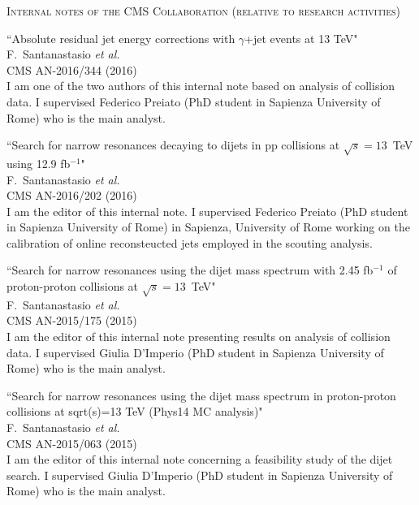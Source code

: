 \documentclass[10pt, a4paper]{article}
\begin{document}
\begin{thebibliography}{599}
\vspace{0.1cm} \begin{center} \textsc{Internal notes of the CMS Collaboration (relative to research activities)} \end{center} \vspace{0.05cm}

``Absolute residual jet energy corrections with $\gamma$+jet events at 13 TeV"
  \\{}F.~Santanastasio {\it et al.}
  \\{}CMS AN-2016/344 (2016)
  \\ I am one of the two authors of this internal note based on
  analysis of collision data. I supervised
  Federico Preiato (PhD student in Sapienza University of Rome) who is
  the main analyst.

``Search for narrow resonances decaying to dijets in pp collisions at $\sqrt{s}=13$~TeV using 12.9 fb$^{-1}$"
  \\{}F.~Santanastasio {\it et al.}
  \\{}CMS AN-2016/202 (2016)
  \\ I am the editor of this internal note. I supervised Federico Preiato (PhD student in Sapienza University of Rome)
  in Sapienza, University of Rome working on the calibration of online
  reconsteucted jets employed in the scouting analysis.

``Search for narrow resonances using the dijet mass spectrum with 2.45 fb$^{-1}$ of proton-proton collisions at $\sqrt{s}=13$~TeV"
  \\{}F.~Santanastasio {\it et al.}
  \\{}CMS AN-2015/175 (2015)
  \\ I am the editor of this internal note presenting results on
  analysis of collision data. I supervised Giulia D'Imperio (PhD
  student in Sapienza University of Rome) who is the main analyst.

``Search for narrow resonances using the dijet mass spectrum in proton-proton collisions at sqrt(s)=13 TeV (Phys14 MC analysis)"
  \\{}F.~Santanastasio {\it et al.}
  \\{}CMS AN-2015/063 (2015)
  \\ I am the editor of this internal note concerning a feasibility study of
  the dijet search. I supervised Giulia D'Imperio (PhD student in Sapienza University of Rome) who is
  the main analyst.


\end{thebibliography}
\end{document}
